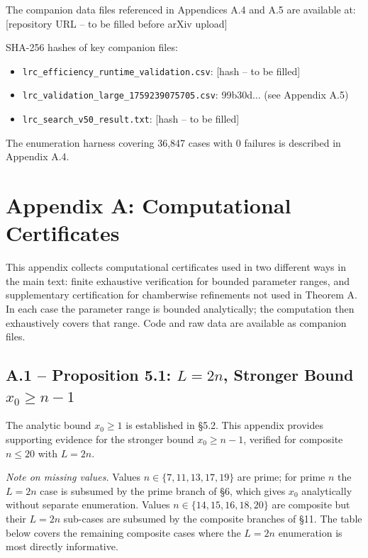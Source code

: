 \documentclass[11pt,a4paper]{article}
\theoremstyle{plain}
\theoremstyle{definition}
\theoremstyle{remark}
\begin{document}
The companion data files referenced in Appendices A.4 and A.5 are available at: [repository URL -- to be filled before arXiv upload]

SHA-256 hashes of key companion files:
\begin{itemize}
\item \texttt{lrc\_efficiency\_runtime\_validation.csv}: [hash -- to be filled]
\item \texttt{lrc\_validation\_large\_1759239075705.csv}: 99b30d... (see Appendix A.5)
\item \texttt{lrc\_search\_v50\_result.txt}: [hash -- to be filled]
\end{itemize}

The enumeration harness covering 36,847 cases with 0 failures is described in Appendix A.4.


\medskip



\section{Appendix A: Computational Certificates}


This appendix collects computational certificates used in two different ways in the main text: finite exhaustive verification for bounded parameter ranges, and supplementary certification for chamberwise refinements not used in Theorem A. In each case the parameter range is bounded analytically; the computation then exhaustively covers that range. Code and raw data are available as companion files.


\subsection{A.1 -- Proposition 5.1: $L = 2n$, Stronger Bound $x_0 \geq n-1$}


The analytic bound $x_0 \geq 1$ is established in §5.2. This appendix provides supporting evidence for the stronger bound $x_0 \geq n-1$, verified for composite $n \leq 20$ with $L = 2n$.

\textit{Note on missing values.} Values $n \in \{7, 11, 13, 17, 19\}$ are prime; for prime $n$ the $L = 2n$ case is subsumed by the prime branch of §6, which gives $x_0$ analytically without separate enumeration. Values $n \in \{14, 15, 16, 18, 20\}$ are composite but their $L = 2n$ sub-cases are subsumed by the composite branches of §11. The table below covers the remaining composite cases where the $L = 2n$ enumeration is most directly informative.
\end{document}
